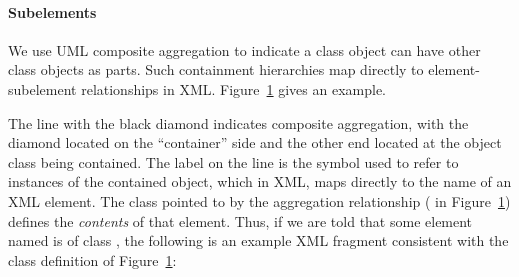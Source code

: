 \begin{blockChanged}
\paragraph{Subelements}

We use UML composite aggregation to indicate a class object can
have other class objects as parts.  Such containment hierarchies
map directly to element-subelement relationships in XML.
Figure~\ref{fig:subelement-eg} gives an example.

\begin{figure}[htb]
  \centering
  \small
  \caption{}
  \label{fig:subelement-eg}
\end{figure}

The line with the black diamond indicates composite aggregation,
with the diamond located on the ``container'' side and the other
end located at the object class being contained.  The label on the
line is the symbol used to refer to instances of the contained
object, which in XML, maps directly to the name of an XML element.
The class pointed to by the aggregation relationship (
in Figure~\ref{fig:subelement-eg}) defines the \emph{contents} of
that element.  Thus, if we are told that some element named
 is of class , the following is an
example XML fragment consistent with the class definition of
Figure~\ref{fig:subelement-eg}:


\end{blockChanged}
